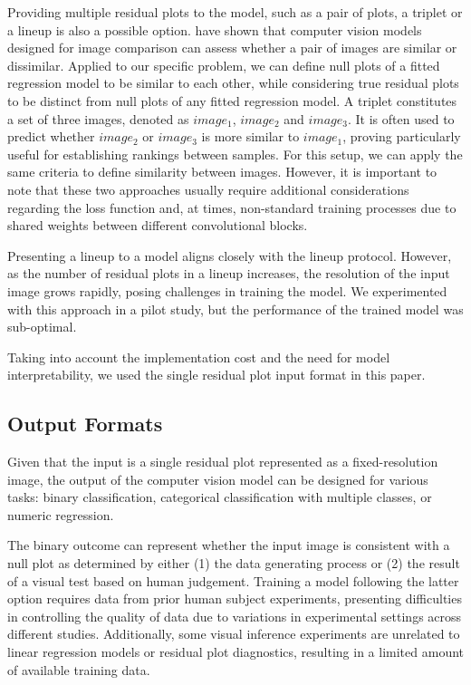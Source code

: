 \documentclass[]{interact}
\theoremstyle{plain}%
\theoremstyle{definition}
\theoremstyle{remark}
\begin{document}
Providing multiple residual plots to the model, such as a pair of plots,
a triplet or a lineup is also a possible option.
\citet{chopra2005learning} have shown that computer vision models
designed for image comparison can assess whether a pair of images are
similar or dissimilar. Applied to our specific problem, we can define
null plots of a fitted regression model to be similar to each other,
while considering true residual plots to be distinct from null plots of
any fitted regression model. A triplet constitutes a set of three
images, denoted as \(image_1\), \(image_2\) and \(image_3\). It is often
used to predict whether \(image_2\) or \(image_3\) is more similar to
\(image_1\), proving particularly useful for establishing rankings
between samples. For this setup, we can apply the same criteria to
define similarity between images. However, it is important to note that
these two approaches usually require additional considerations regarding
the loss function and, at times, non-standard training processes due to
shared weights between different convolutional blocks.

Presenting a lineup to a model aligns closely with the lineup protocol.
However, as the number of residual plots in a lineup increases, the
resolution of the input image grows rapidly, posing challenges in
training the model. We experimented with this approach in a pilot study,
but the performance of the trained model was sub-optimal.

Taking into account the implementation cost and the need for model
interpretability, we used the single residual plot input format in this
paper.

\subsection{Output Formats}\label{output-formats}

Given that the input is a single residual plot represented as a
fixed-resolution image, the output of the computer vision model can be
designed for various tasks: binary classification, categorical
classification with multiple classes, or numeric regression.

The binary outcome can represent whether the input image is consistent
with a null plot as determined by either (1) the data generating process
or (2) the result of a visual test based on human judgement. Training a
model following the latter option requires data from prior human subject
experiments, presenting difficulties in controlling the quality of data
due to variations in experimental settings across different studies.
Additionally, some visual inference experiments are unrelated to linear
regression models or residual plot diagnostics, resulting in a limited
amount of available training data.
\end{document}
